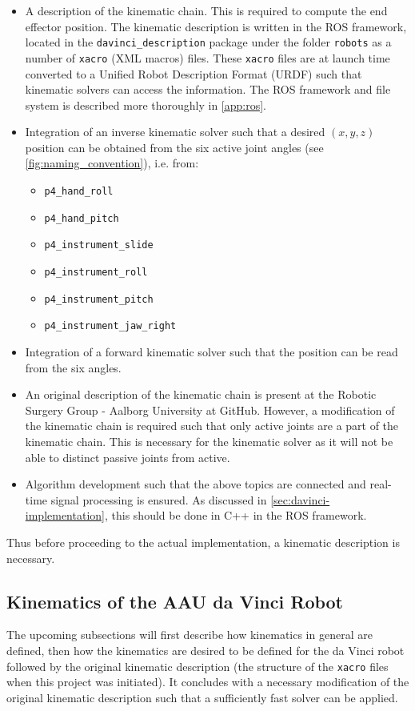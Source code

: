 \begin{itemize}
\item A description of the kinematic chain. This is required to compute the end effector position. The kinematic description is written in the ROS framework, located in the \texttt{davinci\_description} package under the folder \texttt{robots} as a number of \texttt{xacro} (XML macros) files. These \texttt{xacro} files are at launch time converted to a Unified Robot Description Format (URDF) such that kinematic solvers can access the information. The ROS framework and file system is described more thoroughly in \autoref{app:ros}.
\item Integration of an inverse kinematic solver such that a desired $(x,y,z)$ position can be obtained from the six active joint angles (see \autoref{fig:naming_convention}), i.e. from:
\begin{itemize}
\item \texttt{p4\_hand\_roll}
\item \texttt{p4\_hand\_pitch}
\item \texttt{p4\_instrument\_slide}
\item \texttt{p4\_instrument\_roll}
\item \texttt{p4\_instrument\_pitch}
\item \texttt{p4\_instrument\_jaw\_right}
\end{itemize}
\item Integration of a forward kinematic solver such that the position can be read from the six angles.
\item An original description of the kinematic chain is present at the Robotic Surgery Group - Aalborg University at GitHub. However, a modification of the kinematic chain is required such that only active joints are a part of the kinematic chain. This is necessary for the kinematic solver as it will not be able to distinct passive joints from active. 
\item Algorithm development such that the above topics are connected and real-time signal processing is ensured. As discussed in \autoref{sec:davinci-implementation}, this should be done in C++ in the ROS framework. 
\end{itemize} 
Thus before proceeding to the actual implementation, a kinematic description is necessary.

\subsection{Kinematics of the AAU da Vinci Robot}\label{britt}
The upcoming subsections will first describe how kinematics in general are defined, then how the kinematics are desired to be defined for the da Vinci robot followed by the original kinematic description (the structure of the \texttt{xacro} files when this project was initiated). It concludes with a necessary modification of the original kinematic description such that a sufficiently fast solver can be applied. 

